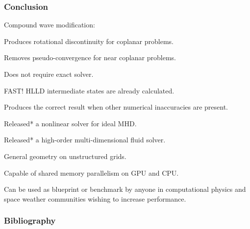 \documentclass{beamer}
\begin{document}
\begin{frame}[fragile]
\frametitle{Conclusion}
\bei
\item Compound wave modification:
\bei
\item Produces rotational discontinuity for coplanar problems.
\item Removes pseudo-convergence for near coplanar problems.
\item Does not require exact solver.
\item FAST! HLLD intermediate states are already calculated.
\item Produces the correct result when other numerical inaccuracies are present.
\ebi
\item Released* a nonlinear solver for ideal MHD.  
\item Released* a high-order multi-dimensional fluid solver.  
\bei 
\item General geometry on unstructured grids. 
\item Capable of shared memory parallelism on GPU and CPU.
\item Can be used as blueprint or benchmark by anyone in computational physics and space weather communities wishing to increase performance. 
\ebi
\ebi
\end{frame}

\begin{frame}[allowframebreaks]
\frametitle{Bibliography}
\printbibliography	%
\end{frame}
\end{document}

